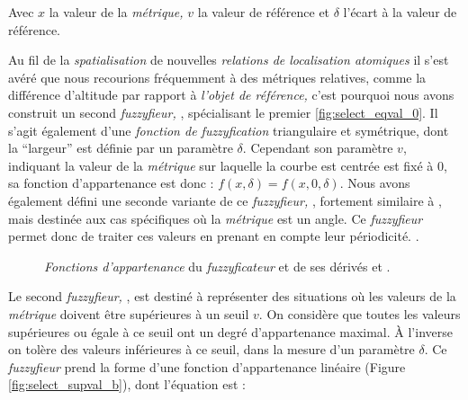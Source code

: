 Avec \(x\) la valeur de la \emph{métrique,} \(v\) la valeur de
référence et \(\delta\) l'écart à la valeur de référence.

Au fil de la \emph{spatialisation} de nouvelles \emph{relations de
  localisation atomiques} il s'est avéré que nous recourions
fréquemment à des métriques relatives, comme la différence d'altitude
par rapport à \emph{l'objet de référence,} c'est pourquoi nous avons
construit un second \emph{fuzzyfieur,} , spécialisant le
premier \autoref{fig:select_eqval_0}. Il s'agit également d'une
\emph{fonction de fuzzyfication} triangulaire et symétrique, dont la
\enquote{largeur} est définie par un paramètre \(\delta\). Cependant
son paramètre \(v\), indiquant la valeur de la \emph{métrique} sur
laquelle la courbe est centrée est fixé à 0, sa fonction
d'appartenance est donc : \(f(x,\delta) = f(x,0,\delta)\). Nous avons
également défini une seconde variante de ce \emph{fuzzyfieur,}
, fortement similaire à , mais destinée
aux cas spécifiques où la \emph{métrique} est un angle. Ce
\emph{fuzzyfieur} permet donc de traiter ces valeurs en prenant en
compte leur périodicité. .

\begin{figure}
  \centering
  \hfill  
  
  \caption{\emph{Fonctions d'appartenance} du \emph{fuzzyficateur}
    \protect{} et de ses dérivés \protect{}
    et \protect{}.}
  \label{fig:select_eqval}
\end{figure}

Le second \emph{fuzzyfieur,} , est destiné à
représenter des situations où les valeurs de la \emph{métrique}
doivent être supérieures à un seuil \(v\). On considère que toutes les
valeurs supérieures ou égale à ce seuil ont un degré d'appartenance
maximal. À l'inverse on tolère des valeurs inférieures à ce seuil,
dans la mesure d'un paramètre \(\delta\). Ce \emph{fuzzyfieur} prend
la forme d'une fonction d'appartenance linéaire (Figure
\ref{fig:select_supval_b}), dont l'équation est :

